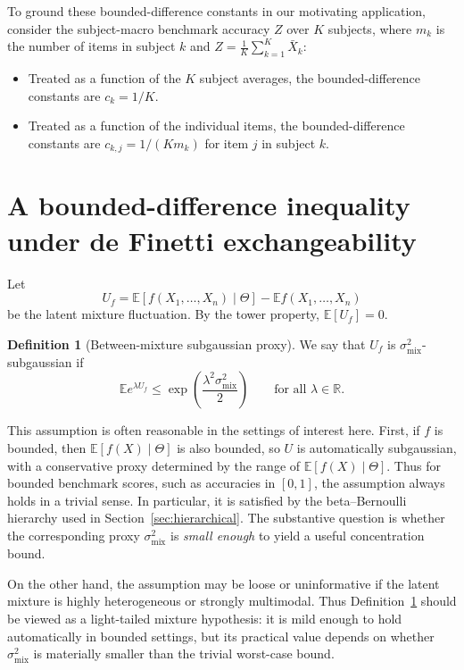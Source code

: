 \documentclass[11pt]{article}
\newcommand{\E}{\mathbb{E}}
\newcommand{\R}{\mathbb{R}}
\theoremstyle{definition}
\newtheorem{definition}[theorem]{Definition}
\theoremstyle{remark}
\begin{document}
To ground these bounded-difference constants in our motivating application, consider the subject-macro benchmark accuracy $Z$ over $K$ subjects, where $m_k$ is the number of items in subject $k$ and $Z = \frac{1}{K}\sum_{k=1}^K \bar X_k$:
\begin{itemize}[noitemsep]
\item Treated as a function of the $K$ subject averages, the bounded-difference constants are $c_k = 1/K$.
\item Treated as a function of the individual items, the bounded-difference constants are $c_{k,j} = 1/(K m_k)$ for item $j$ in subject $k$.
\end{itemize}

\section{A bounded-difference inequality under de Finetti exchangeability}\label{sec:main-bound}


Let
\[
    U_f
    =
    \E[f(X_1,\ldots,X_n)\mid\Theta]
    -
    \E f(X_1,\ldots,X_n)
\]
be the latent mixture fluctuation. By the tower property, $\E [U_f]=0$.

\begin{definition}[Between-mixture subgaussian proxy]\label{def:sigma-mix}
We say that $U_f$ is $\sigma_{\mathrm{mix}}^2$-subgaussian if
\[
    \E e^{\lambda U_f}
    \le
    \exp\!\left(\frac{\lambda^2\sigma_{\mathrm{mix}}^2}{2}\right)
    \qquad\text{for all }\lambda\in\R.
\]
\end{definition}

This assumption is often reasonable in the settings of interest here. First, if $f$ is bounded, then $\E[f(X)\mid\Theta]$ is also bounded, so $U$ is automatically subgaussian, with a conservative proxy determined by the range of $\E[f(X)\mid\Theta]$. Thus for bounded benchmark scores, such as accuracies in $[0,1]$, the assumption always holds in a trivial sense. In particular, it is satisfied by the beta--Bernoulli hierarchy used in Section~\ref{sec:hierarchical}. The substantive question is whether the corresponding proxy $\sigma^2_{\mathrm{mix}}$ is \emph{small enough} to yield a useful concentration bound. 

On the other hand, the assumption may be loose or uninformative if the latent mixture is highly heterogeneous or strongly multimodal. Thus Definition~\ref{def:sigma-mix} should be viewed as a light-tailed mixture hypothesis: it is mild enough to hold automatically in bounded settings, but its practical value depends on whether $\sigma^2_{\mathrm{mix}}$ is materially smaller than the trivial worst-case bound.
\end{document}
